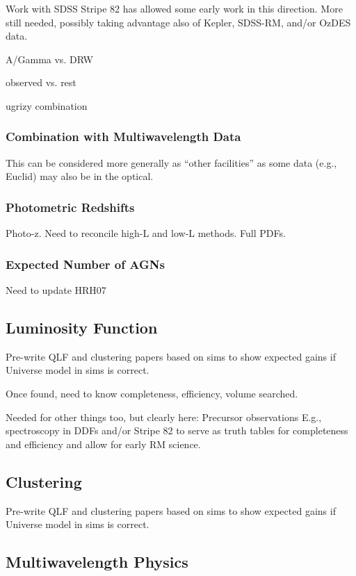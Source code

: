 Work with SDSS Stripe 82 has allowed some early work in this
direction.  More still needed, possibly taking advantage also of
Kepler, SDSS-RM, and/or OzDES data.

A/Gamma vs. DRW

observed vs. rest

ugrizy combination


\subsubsection{Combination with Multiwavelength Data}

This can be considered more generally as ``other facilities'' as some
data (e.g., Euclid) may also be in the optical.


\subsubsection{Photometric Redshifts}

Photo-z.  Need to reconcile high-L and low-L methods.  Full PDFs.

\subsubsection{Expected Number of AGNs}

Need to update HRH07

\subsection{Luminosity Function}


Pre-write QLF and clustering papers based on sims to show expected
gains if Universe model in sims is correct.

Once found, need to know completeness, efficiency, volume searched.


Needed for other things too, but clearly here:
Precursor observations
E.g., spectroscopy in DDFs and/or Stripe 82 to serve as truth tables
for completeness and efficiency and allow for early RM science.


\subsection{Clustering}

Pre-write QLF and clustering papers based on sims to show expected
gains if Universe model in sims is correct.


\subsection{Multiwavelength Physics}

